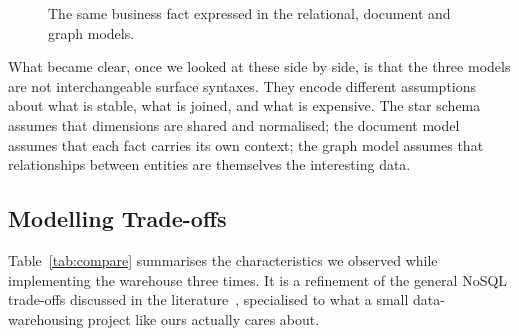 \documentclass[11pt,a4paper]{article}
\begin{document}
\begin{figure}[H]
\centering
\caption{The same business fact expressed in the relational, document and graph models.}
\label{fig:three-models}
\end{figure}

What became clear, once we looked at these side by side, is that the
three models are not interchangeable surface syntaxes. They encode
different assumptions about what is stable, what is joined, and what is
expensive. The star schema assumes that dimensions are shared and
normalised; the document model assumes that each fact carries its own
context; the graph model assumes that relationships between entities are
themselves the interesting data.

\subsection{Modelling Trade-offs}

Table~\ref{tab:compare} summarises the characteristics we observed while
implementing the warehouse three times. It is a refinement of the general
NoSQL trade-offs discussed in the
literature~\cite{cattell2011nosql,gessert2017nosql,grolinger2013cloud},
specialised to what a small data-warehousing project like ours actually
cares about.
\end{document}
